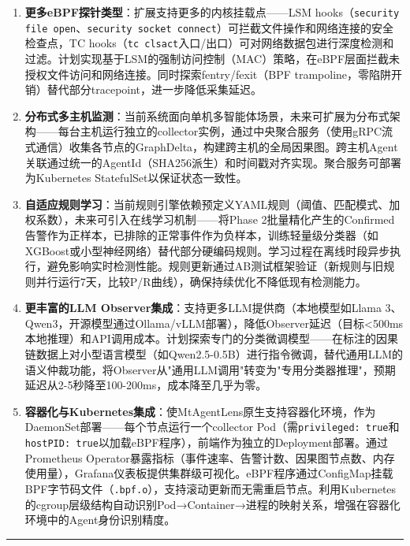 \documentclass[a4paper]{ctexart}
\makeatletter
\renewcommand{\_}{%
  \ifmmode
    \nfss@text{\textunderscore}%
  \else
    \textunderscore\discretionary{}{}{}%
  \fi}
\makeatother
\begin{document}
\begin{enumerate}
\item \textbf{更多eBPF探针类型}：扩展支持更多的内核挂载点——LSM hooks（\texttt{security\_file\_open}、\texttt{security\_socket\_connect}）可拦截文件操作和网络连接的安全检查点，TC hooks（\texttt{tc\_clsact}入口/出口）可对网络数据包进行深度检测和过滤。计划实现基于LSM的强制访问控制（MAC）策略，在eBPF层面拦截未授权文件访问和网络连接。同时探索fentry/fexit（BPF trampoline，零陷阱开销）替代部分tracepoint，进一步降低采集延迟。

\item \textbf{分布式多主机监测}：当前系统面向单机多智能体场景，未来可扩展为分布式架构——每台主机运行独立的collector实例，通过中央聚合服务（使用gRPC流式通信）收集各节点的GraphDelta，构建跨主机的全局因果图。跨主机Agent关联通过统一的AgentId（SHA256派生）和时间戳对齐实现。聚合服务可部署为Kubernetes StatefulSet以保证状态一致性。

\item \textbf{自适应规则学习}：当前规则引擎依赖预定义YAML规则（阈值、匹配模式、加权系数），未来可引入在线学习机制——将Phase 2批量精化产生的Confirmed告警作为正样本，已排除的正常事件作为负样本，训练轻量级分类器（如XGBoost或小型神经网络）替代部分硬编码规则。学习过程在离线时段异步执行，避免影响实时检测性能。规则更新通过AB测试框架验证（新规则与旧规则并行运行7天，比较P/R曲线），确保持续优化不降低现有检测能力。

\item \textbf{更丰富的LLM Observer集成}：支持更多LLM提供商（本地模型如Llama 3、Qwen3，开源模型通过Ollama/vLLM部署），降低Observer延迟（目标<500ms本地推理）和API调用成本。计划探索专门的分类微调模型——在标注的因果链数据上对小型语言模型（如Qwen2.5-0.5B）进行指令微调，替代通用LLM的语义仲裁功能，将Observer从"通用LLM调用"转变为"专用分类器推理"，预期延迟从2-5秒降至100-200ms，成本降至几乎为零。

\item \textbf{容器化与Kubernetes集成}：使MtAgentLens原生支持容器化环境，作为DaemonSet部署——每个节点运行一个collector Pod（需\texttt{privileged: true}和\texttt{hostPID: true}以加载eBPF程序），前端作为独立的Deployment部署。通过Prometheus Operator暴露指标（事件速率、告警计数、因果图节点数、内存使用量），Grafana仪表板提供集群级可视化。eBPF程序通过ConfigMap挂载BPF字节码文件（\texttt{.bpf.o}），支持滚动更新而无需重启节点。利用Kubernetes的cgroup层级结构自动识别Pod→Container→进程的映射关系，增强在容器化环境中的Agent身份识别精度。
\end{enumerate}

\bigskip
\hrule
\bigskip
\end{document}
